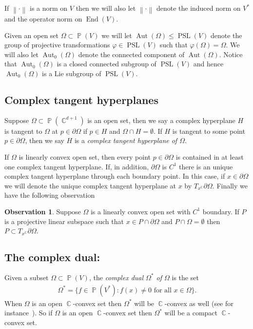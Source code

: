 \documentclass[12pt]{amsart}
\theoremstyle{plain}
\theoremstyle{definition}
\newtheorem{observation}[proposition]{Observation}
\theoremstyle{remark}
\begin{document}
If ${\left\|{ \cdot }\right\|}$ is a norm on $V$ then we will also let  ${\left\|{ \cdot}\right\|}$ denote the induced norm on $V^*$ and the operator norm on $\operatorname{End}(V)$.

Given an open set $\Omega \subset \operatorname{\mathbb{P}}(V)$ we will let $\operatorname{Aut}(\Omega) \leq \operatorname{PSL}(V)$ denote the group of projective transformations $\varphi \in \operatorname{PSL}(V)$ such that $\varphi(\Omega)=\Omega$. We will also let $\operatorname{Aut}_0(\Omega)$ denote the connected component of $\operatorname{Aut}(\Omega)$. Notice that $\operatorname{Aut}_0(\Omega)$ is a closed connected subgroup of $\operatorname{PSL}(V)$ and hence $\operatorname{Aut}_0(\Omega)$  is a Lie subgroup of $\operatorname{PSL}(V)$.

\subsection{Complex tangent hyperplanes} Suppose $\Omega \subset \operatorname{\mathbb{P}}(\operatorname{\mathbb{C}}^{d+1})$ is an open set, then we say a complex hyperplane $H$ is tangent to $\Omega$ at $p \in \partial \Omega$ if $p \in H$ and $\Omega \cap H = \emptyset$. If $H$ is tangent to some point $p \in \partial \Omega$, then we say $H$ is a \emph{complex tangent hyperplane of $\Omega$}. 

If $\Omega$ is linearly convex open set, then every point $p \in \partial \Omega$ is contained in at least one complex tangent hyperplane. If, in addition, $\partial \Omega$ is $C^1$ there is an unique complex tangent hyperplane through each boundary point. In this case, if $x \in \partial \Omega$ we will denote the unique complex tangent hyperplane at $x$ by $T_x^\operatorname{\mathbb{C}} \partial \Omega$. Finally we have the following observation 

\begin{observation}
Suppose $\Omega$ is a linearly convex open set with $C^1$ boundary. If $P$ is a projective linear subspace such that $x \in P \cap \partial \Omega$ and $P \cap \Omega = \emptyset$ then $P \subset T_x^\operatorname{\mathbb{C}} \partial \Omega$.
\end{observation}

\subsection{The complex dual:} Given a subset $\Omega \subset \operatorname{\mathbb{P}}(V)$, the \emph{complex dual $\Omega^*$ of $\Omega$} is the set
\begin{align*}
\Omega^* = \{ f \in \operatorname{\mathbb{P}}(V^*) : f(x) \neq 0 \text{ for all } x \in \Omega\}.
\end{align*}
When $\Omega$ is an open $\operatorname{\mathbb{C}}$-convex set then $\Omega^*$ will be $\operatorname{\mathbb{C}}$-convex as well (see for instance~\cite[Theorem 2.3.9]{APS2004}). So if $\Omega$ is an open $\operatorname{\mathbb{C}}$-convex set then $\Omega^*$ will be a compact $\operatorname{\mathbb{C}}$-convex set. 
\end{document}
